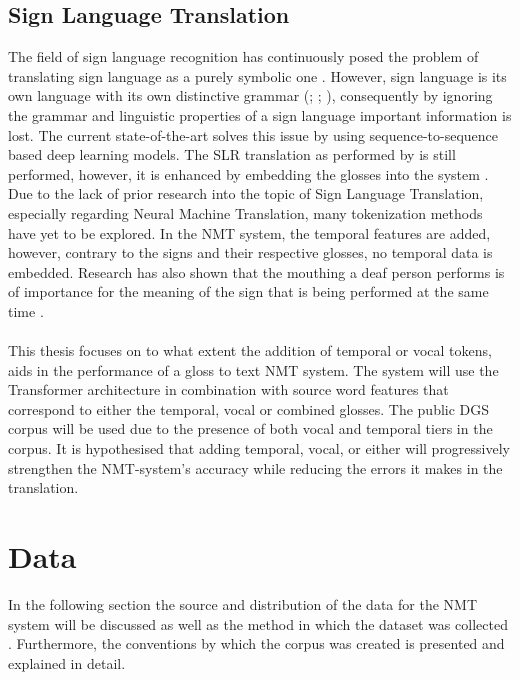 \subsection{Sign Language Translation}

The field of sign language recognition has continuously posed the problem of translating sign language as a purely symbolic one \cite{camgoz2018neural}. However, sign language is its own language with its own distinctive grammar (\citealp{perniss2007}; \citealp{camgoz2018neural}; \citealp{camgoz2020sign}), consequently by ignoring the grammar and linguistic properties of a sign language important information is lost. The current state-of-the-art solves this issue by using sequence-to-sequence based deep learning models. The SLR translation as performed by \citealp{koller2015continuous} is still performed, however, it is enhanced by embedding the glosses into the system \cite{camgoz2018neural}. Due to the lack of prior research into the topic of Sign Language Translation, especially regarding Neural Machine Translation, many tokenization methods have yet to be explored. In the NMT system, the temporal features are added, however, contrary to the signs and their respective glosses, no temporal data is embedded. Research has also shown that the mouthing a deaf person performs is of importance for the meaning of the sign that is being performed at the same time \cite{konradoffentliches}.
\\
\\
This thesis focuses on to what extent the addition of temporal or vocal tokens, aids in the performance of a gloss to text NMT system. The system will use the Transformer architecture in combination with source word features \cite{garcia2016factored} that correspond to either the temporal, vocal or combined glosses. The public DGS corpus \cite{dgscorpus_3} will be used due to the presence of both vocal and temporal tiers in the corpus. It is hypothesised that adding temporal, vocal, or either will progressively strengthen the NMT-system's accuracy while reducing the errors it makes in the translation.


\section{Data}

In the following section the source and distribution of the data for the NMT system will be discussed as well as the method in which the dataset was collected \cite{age_data_hamburg}. Furthermore, the conventions by which the corpus was created is presented and explained in detail.

